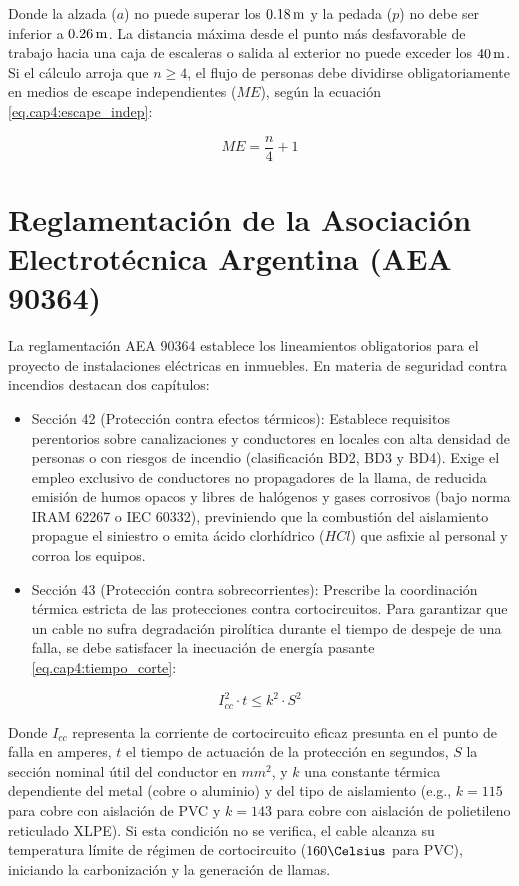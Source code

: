 Donde la alzada ($a$) no puede superar los $0.18\,\mathrm{m}$ y la pedada ($p$) no debe ser inferior a $0.26\,\mathrm{m}$. La distancia
máxima desde el punto más desfavorable de trabajo hacia una caja de escaleras o salida al exterior no puede exceder los
$40\,\mathrm{m}$. Si el cálculo arroja que $n \ge 4$, el flujo de personas debe dividirse obligatoriamente en medios de escape
independientes ($ME$), según la ecuación \ref{eq.cap4:escape_indep}:

\begin{equation}
\label{eq.cap4:escape_indep}
ME = \frac{n}{4} + 1
\end{equation}

\section{Reglamentación de la Asociación Electrotécnica Argentina (AEA 90364)}

La reglamentación AEA 90364 establece los lineamientos obligatorios para el proyecto de instalaciones eléctricas en
inmuebles. En materia de seguridad contra incendios destacan dos capítulos:

\begin{itemize}
    \item Sección 42 (Protección contra efectos térmicos): Establece requisitos perentorios sobre canalizaciones y
          conductores en locales con alta densidad de personas o con riesgos de incendio (clasificación BD2, BD3 y BD4).
          Exige el empleo exclusivo de conductores no propagadores de la llama, de reducida emisión de humos opacos y
          libres de halógenos y gases corrosivos (bajo norma IRAM 62267 o IEC 60332), previniendo que la combustión del
          aislamiento propague el siniestro o emita ácido clorhídrico ($HCl$) que asfixie al personal y corroa los
          equipos.
    \item Sección 43 (Protección contra sobrecorrientes): Prescribe la coordinación térmica estricta de las protecciones
          contra cortocircuitos. Para garantizar que un cable no sufra degradación pirolítica durante el tiempo de
          despeje de una falla, se debe satisfacer la inecuación de energía pasante \ref{eq.cap4:tiempo_corte}:
\end{itemize}

\begin{equation}
\label{eq.cap4:tiempo_corte}
I_{cc}^2 \cdot t \le k^2 \cdot S^2
\end{equation}

Donde $I_{cc}$ representa la corriente de cortocircuito eficaz presunta en el punto de falla en amperes, $t$ el tiempo
de actuación de la protección en segundos, $S$ la sección nominal útil del conductor en $mm^2$, y $k$ una constante
térmica dependiente del metal (cobre o aluminio) y del tipo de aislamiento (e.g., $k = 115$ para cobre con aislación de
PVC y $k = 143$ para cobre con aislación de polietileno reticulado XLPE). Si esta condición no se verifica, el cable
alcanza su temperatura límite de régimen de cortocircuito ($160\Celsius$ para PVC), iniciando la carbonización y la
generación de llamas.

